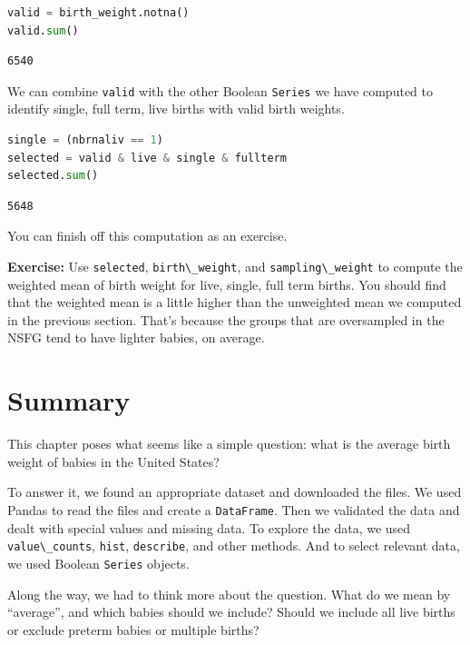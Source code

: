 \begin{lstlisting}[language=Python,style=source]
valid = birth_weight.notna()
valid.sum()
\end{lstlisting}

\begin{lstlisting}[style=output]
6540
\end{lstlisting}

We can combine \passthrough{\lstinline!valid!} with the other Boolean
\passthrough{\lstinline!Series!} we have computed to identify single,
full term, live births with valid birth weights.

\begin{lstlisting}[language=Python,style=source]
single = (nbrnaliv == 1)
selected = valid & live & single & fullterm
selected.sum()
\end{lstlisting}

\begin{lstlisting}[style=output]
5648
\end{lstlisting}

You can finish off this computation as an exercise.

\textbf{Exercise:} Use \passthrough{\lstinline!selected!},
\passthrough{\lstinline!birth\_weight!}, and
\passthrough{\lstinline!sampling\_weight!} to compute the weighted mean
of birth weight for live, single, full term births. You should find that
the weighted mean is a little higher than the unweighted mean we
computed in the previous section. That's because the groups that are
oversampled in the NSFG tend to have lighter babies, on average.

\hypertarget{summary}{%
\section{Summary}\label{summary}}

This chapter poses what seems like a simple question: what is the
average birth weight of babies in the United States?

To answer it, we found an appropriate dataset and downloaded the files.
We used Pandas to read the files and create a
\passthrough{\lstinline!DataFrame!}. Then we validated the data and
dealt with special values and missing data. To explore the data, we used
\passthrough{\lstinline!value\_counts!}, \passthrough{\lstinline!hist!},
\passthrough{\lstinline!describe!}, and other methods. And to select
relevant data, we used Boolean \passthrough{\lstinline!Series!} objects.

Along the way, we had to think more about the question. What do we mean
by ``average'', and which babies should we include? Should we include
all live births or exclude preterm babies or multiple births?

